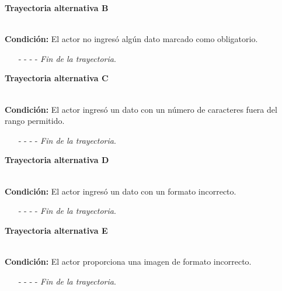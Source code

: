 \hypertarget{CU11-1:TAB}{\textbf{Trayectoria alternativa B}}\\
\noindent \textbf{Condición:} El actor no ingresó algún dato marcado como obligatorio.
\begin{enumerate}
	\UCpaso[\UCsist] Muestra el mensaje  señalando el campo que presenta el error en la pantalla .
	\UCpaso Regresa al paso \ref{CU11.1-P3} de la trayectoria principal.
	\item[- -] - - {\em {Fin de la trayectoria}}.%
\end{enumerate}
\hypertarget{CU11-1:TAC}{\textbf{Trayectoria alternativa C}}\\
\noindent \textbf{Condición:} El actor ingresó un dato con un número de caracteres fuera del rango permitido.
\begin{enumerate}
	\UCpaso[\UCsist] Muestra el mensaje  señalando el campo que presenta el error en la pantalla .
	\UCpaso Regresa al paso \ref{CU11.1-P3} de la trayectoria principal.
	\item[- -] - - {\em {Fin de la trayectoria}}.%
\end{enumerate}
\hypertarget{CU11-1:TAD}{\textbf{Trayectoria alternativa D}}\\
\noindent \textbf{Condición:} El actor ingresó un dato con un formato incorrecto.
\begin{enumerate}
	\UCpaso[\UCsist] Muestra el mensaje  señalando el campo que presenta el error en la pantalla .
	\UCpaso Regresa al paso \ref{CU11.1-P3} de la trayectoria principal.
	\item[- -] - - {\em {Fin de la trayectoria}}.
\end{enumerate}
\hypertarget{CU11-1:TAE}{\textbf{Trayectoria alternativa E}}\\
\noindent \textbf{Condición:} El actor proporciona una imagen de formato incorrecto.
\begin{enumerate}
	\UCpaso[\UCsist] Muestra el mensaje  señalando el campo que presenta el error en la pantalla .
	\UCpaso Regresa al paso \ref{CU11.1-P4} de la trayectoria principal.
	\item[- -] - - {\em {Fin de la trayectoria}}.
\end{enumerate}
